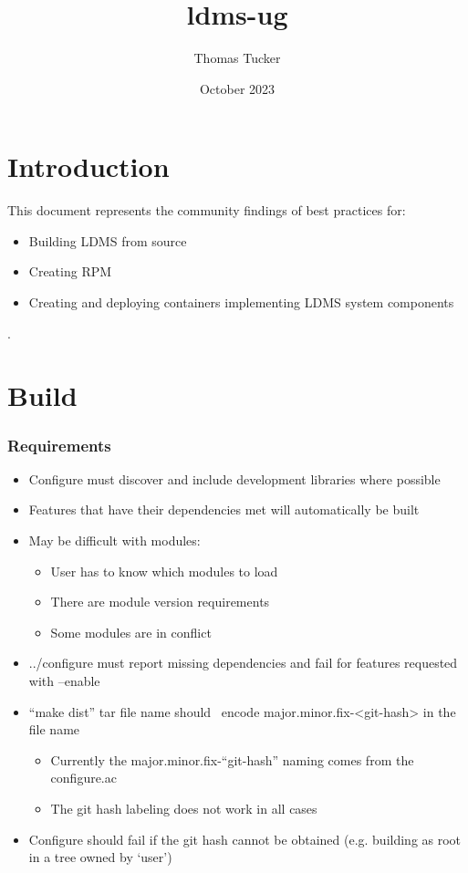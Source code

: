 \documentclass{article}
\title{ldms-ug}
\author{Thomas Tucker}
\date{October 2023}
\begin{document}
\maketitle

\section{Introduction}
This document represents the community findings of best practices for:
\begin{itemize}
    \item Building LDMS from source
    \item Creating RPM
    \item Creating and deploying containers implementing LDMS system components
\end{itemize}.

\section{Build}
\subsubsection{Requirements}

\begin{itemize}
    \item Configure must discover and include development libraries where possible
    \item Features that have their dependencies met will automatically be built
    \item May be difficult with modules:
        \begin{itemize}
            \item User has to know which modules to load
            \item There are module version requirements
            \item Some modules are in conflict
        \end{itemize}
    \item ../configure must report missing dependencies and fail for features requested with –enable
    \item “make dist” tar file name should  encode major.minor.fix-<git-hash> in the file name
        \begin{itemize}
            \item Currently the major.minor.fix-``git-hash'' naming comes from the configure.ac
            \item The git hash labeling does not work in all cases
        \end{itemize}
    \item Configure should fail if the git hash cannot be obtained (e.g. building as root in a tree owned by ‘user’)
\end{itemize}
\end{document}
